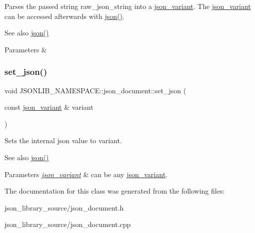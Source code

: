 Parses the passed string {\ttfamily raw\+\_\+json\+\_\+string} into a \hyperlink{classJSONLIB__NAMESPACE_1_1json__variant}{json\+\_\+variant}. The \hyperlink{classJSONLIB__NAMESPACE_1_1json__variant}{json\+\_\+variant} can be accessed afterwards with \hyperlink{classJSONLIB__NAMESPACE_1_1json__document_ad87b8e7d68ba854dbd730758273a3b93}{json()}. 

\begin{DoxySeeAlso}{See also}
\hyperlink{classJSONLIB__NAMESPACE_1_1json__document_ad87b8e7d68ba854dbd730758273a3b93}{json()} 
\end{DoxySeeAlso}

\begin{DoxyParams}{Parameters}
{\em } & \\
\hline
\end{DoxyParams}
\mbox{\label{classJSONLIB__NAMESPACE_1_1json__document_ae6c52de0f1b1b6e5825f9555b6026e1b}} 
\subsubsection{\texorpdfstring{set\+\_\+json()}{set\_json()}\hspace{0.1cm}{\footnotesize\ttfamily [2/2]}}
{\footnotesize\ttfamily void J\+S\+O\+N\+L\+I\+B\+\_\+\+N\+A\+M\+E\+S\+P\+A\+C\+E\+::json\+\_\+document\+::set\+\_\+json (\begin{DoxyParamCaption}\item[{const \hyperlink{classJSONLIB__NAMESPACE_1_1json__variant}{json\+\_\+variant} \&}]{variant }\end{DoxyParamCaption})}



Sets the internal json value to {\ttfamily variant}. 

\begin{DoxySeeAlso}{See also}
\hyperlink{classJSONLIB__NAMESPACE_1_1json__document_ad87b8e7d68ba854dbd730758273a3b93}{json()} 
\end{DoxySeeAlso}

\begin{DoxyParams}{Parameters}
{\em \hyperlink{classJSONLIB__NAMESPACE_1_1json__variant}{json\+\_\+variant}} & can be any \hyperlink{classJSONLIB__NAMESPACE_1_1json__variant}{json\+\_\+variant}. \\
\hline
\end{DoxyParams}


The documentation for this class was generated from the following files\+:\begin{DoxyCompactItemize}
\item 
json\+\_\+library\+\_\+source/json\+\_\+document.\+h\item 
json\+\_\+library\+\_\+source/json\+\_\+document.\+cpp\end{DoxyCompactItemize}

